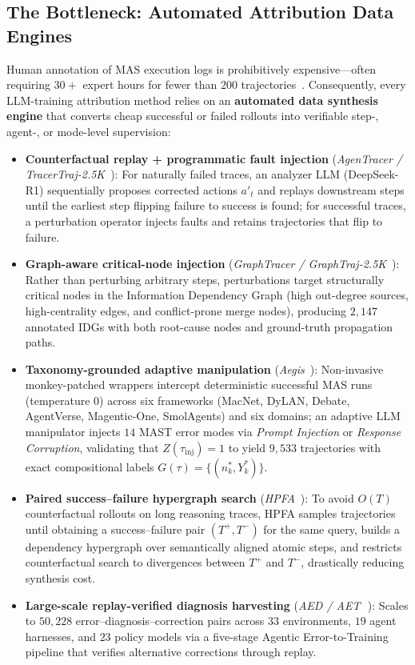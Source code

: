 \subsection{The Bottleneck: Automated Attribution Data Engines}
Human annotation of MAS execution logs is prohibitively expensive---often requiring $30+$ expert hours for fewer than $200$ trajectories~\citep{yu2026correct,zhang2025who}. Consequently, every LLM-training attribution method relies on an \textbf{automated data synthesis engine} that converts cheap successful or failed rollouts into verifiable step-, agent-, or mode-level supervision:
\begin{itemize}
  \item \textbf{Counterfactual replay + programmatic fault injection} (\emph{AgenTracer / TracerTraj-2.5K}~\citep{zhang2026agentracer}): For naturally failed traces, an analyzer LLM (DeepSeek-R1) sequentially proposes corrected actions $a'_t$ and replays downstream steps until the earliest step flipping failure to success is found; for successful traces, a perturbation operator injects faults and retains trajectories that flip to failure.
  \item \textbf{Graph-aware critical-node injection} (\emph{GraphTracer / GraphTraj-2.5K}~\citep{zhang2025graphtracer}): Rather than perturbing arbitrary steps, perturbations target structurally critical nodes in the Information Dependency Graph (high out-degree sources, high-centrality edges, and conflict-prone merge nodes), producing $2{,}147$ annotated IDGs with both root-cause nodes and ground-truth propagation paths.
  \item \textbf{Taxonomy-grounded adaptive manipulation} (\emph{Aegis}~\citep{kong2026aegis}): Non-invasive monkey-patched wrappers intercept deterministic successful MAS runs (temperature $0$) across six frameworks (MacNet, DyLAN, Debate, AgentVerse, Magentic-One, SmolAgents) and six domains; an adaptive LLM manipulator injects $14$ MAST error modes via \emph{Prompt Injection} or \emph{Response Corruption}, validating that $Z(\tau_{\text{inj}})=1$ to yield $9{,}533$ trajectories with exact compositional labels $G(\tau) = \{(n_k^*, Y_k^*)\}$.
  \item \textbf{Paired success--failure hypergraph search} (\emph{HPFA}~\citep{zhu2026hpfa}): To avoid $O(T)$ counterfactual rollouts on long reasoning traces, HPFA samples trajectories until obtaining a success--failure pair $(T^+, T^-)$ for the same query, builds a dependency hypergraph over semantically aligned atomic steps, and restricts counterfactual search to divergences between $T^+$ and $T^-$, drastically reducing synthesis cost.
  \item \textbf{Large-scale replay-verified diagnosis harvesting} (\emph{AED / AET}~\citep{zhu2026aed}\,\webtag): Scales to $50{,}228$ error--diagnosis--correction pairs across $33$ environments, $19$ agent harnesses, and $23$ policy models via a five-stage Agentic Error-to-Training pipeline that verifies alternative corrections through replay.
\end{itemize}

